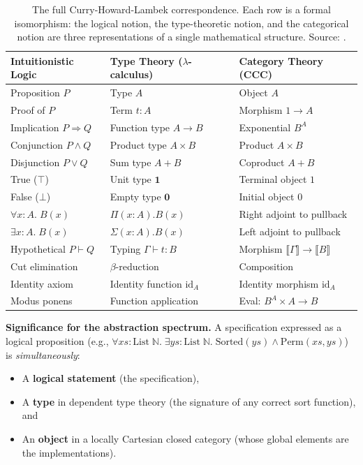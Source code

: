 \documentclass[11pt, a4paper, logo, copyright]{googledeepmind}
\begin{document}
\begin{table}[H]
\centering
\small
\begin{tabular}{lll}
\toprule
\textbf{Intuitionistic Logic} & \textbf{Type Theory ($\lambda$-calculus)} & \textbf{Category Theory (CCC)} \\
\midrule
Proposition $P$ & Type $A$ & Object $A$ \\
Proof of $P$ & Term $t : A$ & Morphism $1 \to A$ \\
Implication $P \Rightarrow Q$ & Function type $A \to B$ & Exponential $B^A$ \\
Conjunction $P \wedge Q$ & Product type $A \times B$ & Product $A \times B$ \\
Disjunction $P \vee Q$ & Sum type $A + B$ & Coproduct $A + B$ \\
True ($\top$) & Unit type $\mathbf{1}$ & Terminal object $1$ \\
False ($\bot$) & Empty type $\mathbf{0}$ & Initial object $0$ \\
$\forall x{:}A.\; B(x)$ & $\Pi(x{:}A).B(x)$ & Right adjoint to pullback \\
$\exists x{:}A.\; B(x)$ & $\Sigma(x{:}A).B(x)$ & Left adjoint to pullback \\
Hypothetical $P \vdash Q$ & Typing $\Gamma \vdash t : B$ & Morphism $\llbracket\Gamma\rrbracket \to \llbracket B \rrbracket$ \\
Cut elimination & $\beta$-reduction & Composition \\
Identity axiom & Identity function $\text{id}_A$ & Identity morphism $\text{id}_A$ \\
Modus ponens & Function application & Eval: $B^A \times A \to B$ \\
\bottomrule
\end{tabular}
\caption{The full Curry-Howard-Lambek correspondence. Each row is a formal isomorphism: the logical notion, the type-theoretic notion, and the categorical notion are three representations of a single mathematical structure. Source: \citet{lambek1986higher, wadler2015propositions}.}
\label{tab:chl-full}
\end{table}

\textbf{Significance for the abstraction spectrum.} A specification expressed as a logical proposition (e.g., $\forall xs : \text{List}\;\mathbb{N}.\; \exists ys : \text{List}\;\mathbb{N}.\; \text{Sorted}(ys) \wedge \text{Perm}(xs, ys)$) is \emph{simultaneously}:
\begin{itemize}
    \item A \textbf{logical statement} (the specification),
    \item A \textbf{type} in dependent type theory (the signature of any correct sort function), and
    \item An \textbf{object} in a locally Cartesian closed category (whose global elements are the implementations).
\end{itemize}
\end{document}
